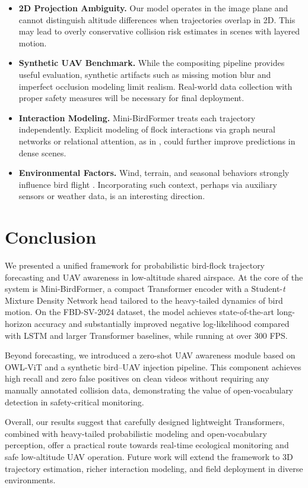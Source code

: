 \documentclass[journal]{IEEEtran}
\begin{document}
	\begin{itemize}
		\item \textbf{2D Projection Ambiguity.} Our model operates in the image plane and cannot distinguish altitude differences when trajectories overlap in 2D. This may lead to overly conservative collision risk estimates in scenes with layered motion.
		\item \textbf{Synthetic UAV Benchmark.} While the compositing pipeline provides useful evaluation, synthetic artifacts such as missing motion blur and imperfect occlusion modeling limit realism. Real-world data collection with proper safety measures will be necessary for final deployment.
		\item \textbf{Interaction Modeling.} Mini-BirdFormer treats each trajectory independently. Explicit modeling of flock interactions via graph neural networks or relational attention, as in \cite{Yuan2021AgentFormer,Liu2022HiVT}, could further improve predictions in dense scenes.
		\item \textbf{Environmental Factors.} Wind, terrain, and seasonal behaviors strongly influence bird flight \cite{Nagelkerke2018Flight}. Incorporating such context, perhaps via auxiliary sensors or weather data, is an interesting direction.
	\end{itemize}
	\section{Conclusion}
	\label{sec:conclusion}
	
	We presented a unified framework for probabilistic bird-flock trajectory forecasting and UAV awareness in low-altitude shared airspace. At the core of the system is Mini-BirdFormer, a compact Transformer encoder with a Student-\textit{t} Mixture Density Network head tailored to the heavy-tailed dynamics of bird motion. On the FBD-SV-2024 dataset, the model achieves state-of-the-art long-horizon accuracy and substantially improved negative log-likelihood compared with LSTM and larger Transformer baselines, while running at over 300 FPS.
	
	Beyond forecasting, we introduced a zero-shot UAV awareness module based on OWL-ViT and a synthetic bird--UAV injection pipeline. This component achieves high recall and zero false positives on clean videos without requiring any manually annotated collision data, demonstrating the value of open-vocabulary detection in safety-critical monitoring.
	
	Overall, our results suggest that carefully designed lightweight Transformers, combined with heavy-tailed probabilistic modeling and open-vocabulary perception, offer a practical route towards real-time ecological monitoring and safe low-altitude UAV operation. Future work will extend the framework to 3D trajectory estimation, richer interaction modeling, and field deployment in diverse environments.
	
	
	
	
	
\end{document}
